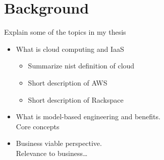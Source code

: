 \section{Background}

Explain some of the topics in my thesis

\begin{itemize}
  \item What is cloud computing and IaaS
    \begin{itemize}
      \item Summarize nist definition of cloud
      \item Short description of AWS
      \item Short description of Rackspace
    \end{itemize}
  \item What is model-based engineering and benefits. \\
      Core concepts
  \item Business viable perspective. \\
    Relevance to business\ldots
\end{itemize}
